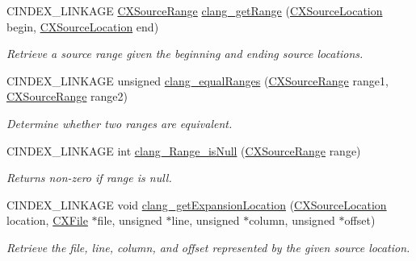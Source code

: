 \begin{DoxyCompactItemize}
\mbox{\label{group__CINDEX__LOCATIONS_ga4e2b6d439f72fdee12c2e4dcf4ff1e2f}} 
C\+I\+N\+D\+E\+X\+\_\+\+L\+I\+N\+K\+A\+GE \hyperlink{structCXSourceRange}{C\+X\+Source\+Range} \hyperlink{group__CINDEX__LOCATIONS_ga4e2b6d439f72fdee12c2e4dcf4ff1e2f}{clang\+\_\+get\+Range} (\hyperlink{structCXSourceLocation}{C\+X\+Source\+Location} begin, \hyperlink{structCXSourceLocation}{C\+X\+Source\+Location} end)
\begin{DoxyCompactList}\small\item\em Retrieve a source range given the beginning and ending source locations. \end{DoxyCompactList}\item 
C\+I\+N\+D\+E\+X\+\_\+\+L\+I\+N\+K\+A\+GE unsigned \hyperlink{group__CINDEX__LOCATIONS_ga07e10740b1e867fe4329c6a2df3f9be7}{clang\+\_\+equal\+Ranges} (\hyperlink{structCXSourceRange}{C\+X\+Source\+Range} range1, \hyperlink{structCXSourceRange}{C\+X\+Source\+Range} range2)
\begin{DoxyCompactList}\small\item\em Determine whether two ranges are equivalent. \end{DoxyCompactList}\item 
\mbox{\label{group__CINDEX__LOCATIONS_ga39213a93703e84c0accdba1f618d7fbb}} 
C\+I\+N\+D\+E\+X\+\_\+\+L\+I\+N\+K\+A\+GE int \hyperlink{group__CINDEX__LOCATIONS_ga39213a93703e84c0accdba1f618d7fbb}{clang\+\_\+\+Range\+\_\+is\+Null} (\hyperlink{structCXSourceRange}{C\+X\+Source\+Range} range)
\begin{DoxyCompactList}\small\item\em Returns non-\/zero if {\ttfamily range} is null. \end{DoxyCompactList}\item 
C\+I\+N\+D\+E\+X\+\_\+\+L\+I\+N\+K\+A\+GE void \hyperlink{group__CINDEX__LOCATIONS_gadee4bea0fa34550663e869f48550eb1f}{clang\+\_\+get\+Expansion\+Location} (\hyperlink{structCXSourceLocation}{C\+X\+Source\+Location} location, \hyperlink{group__CINDEX__FILES_gacfcea9c1239c916597e2e5b3e109215a}{C\+X\+File} $\ast$file, unsigned $\ast$line, unsigned $\ast$column, unsigned $\ast$offset)
\begin{DoxyCompactList}\small\item\em Retrieve the file, line, column, and offset represented by the given source location. \end{DoxyCompactList}\item 

\end{DoxyCompactItemize}
